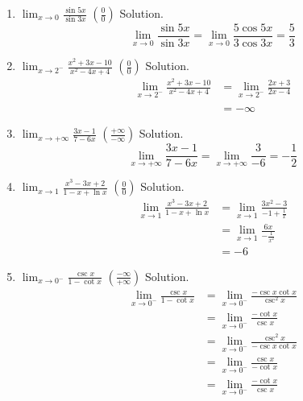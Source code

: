 \documentclass[
  letterpaper,
  DIV=11,
  numbers=noendperiod]{scrartcl}
\begin{document}
\begin{enumerate}
\def\labelenumi{\arabic{enumi}.}
\setcounter{enumi}{1}
\item
  \(\displaystyle\lim_{x \to 0} \frac{\sin5x}{\sin3x}\)
  \(\left(\frac{0}{0}\right)\) Solution. \[
  \displaystyle\lim_{x \to 0} \frac{\sin5x}{\sin3x}=\displaystyle\lim_{x \to 0} \frac{5\cos5x}{3\cos3x}=\frac{5}{3}
  \]
\item
  \(\displaystyle\lim_{x \to 2^-} \frac{x^2+3x-10}{x^2-4x+4}\)
  \(\left(\frac{0}{0}\right)\) Solution. \[
  \begin{aligned}
  \displaystyle\lim_{x \to 2^-} \frac{x^2+3x-10}{x^2-4x+4}&=\displaystyle\lim_{x \to 2^-}\frac{2x+3}{2x-4}\\&\\&=-\infty
  \end{aligned}
  \]
\item
  \(\displaystyle\lim_{x \to +\infty}\frac{3x-1}{7-6x}\)
  \(\left(\frac{+\infty}{-\infty}\right)\) Solution. \[
  \displaystyle\lim_{x \to +\infty}\frac{3x-1}{7-6x}=\displaystyle\lim_{x \to +\infty} \frac{3}{-6}=-\frac{1}{2}
  \]
\item
  \(\displaystyle\lim_{x \to 1} \frac{x^3-3x+2}{1-x+\ln x}\)
  \(\left(\frac{0}{0}\right)\) Solution. \[
  \begin{aligned}
  \displaystyle\lim_{x \to 1} \frac{x^3-3x+2}{1-x+\ln x}&=\displaystyle\lim_{x \to 1}\frac{3x^2-3}{-1+\frac{1}{x}}\\&=\displaystyle\lim_{x \to 1}\frac{6x}{-\frac{1}{x^2}}\\&=-6
  \end{aligned}
  \]
\item
  \(\displaystyle\lim_{x \to 0^-}\frac{\csc x}{1-\cot x}\)
  \(\left(\frac{-\infty}{+\infty}\right)\) Solution. \[
  \begin{aligned}
  \displaystyle\lim_{x \to 0^-}\frac{\csc x}{1-\cot x}&=\displaystyle\lim_{x \to 0^-}\frac{-\csc x \cot x}{\csc^2 x}\\&=\displaystyle\lim_{x \to 0^-}\frac{-\cot x}{\csc x}\\&=\displaystyle\lim_{x \to 0^-} \frac{\csc^2 x}{-\csc x \cot x}\\&=\displaystyle\lim_{x \to 0^-}\frac{\csc x}{-\cot x}\\&=\displaystyle\lim_{x \to 0^-}\frac{-\cot x}{\csc x}
  \end{aligned}
  \]
\end{enumerate}
\end{document}
